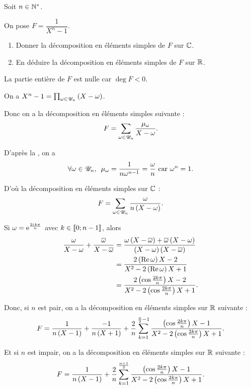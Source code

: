 \begin{exo}
Soit \(n\in\mathbb{N}^*\).

On pose \(F=\dfrac{1}{X^n-1}\).

\begin{enumerate}
\item Donner la décomposition en éléments simples de \(F\) sur \(\mathbb{C}\). \\

\item En déduire la décomposition en éléments simples de \(F\) sur \(\mathbb{R}\).
\end{enumerate}
\end{exo}

\begin{corr}[1]
La partie entière de \(F\) est nulle car \(\deg F<0\).

On a \(X^n-1=\prod_{\omega\in\mathscr{U}_n}\left(X-\omega\right)\).

Donc on a la décomposition en éléments simples suivante : \[F=\sum_{\omega\in\mathscr{U}_n}\dfrac{\mu_\omega}{X-\omega}.\]

D'après la , on a \[\quantifs{\forall\omega\in\U_n}\mu_\omega=\dfrac{1}{n\omega^{n-1}}=\dfrac{\omega}{n}\text{ car }\omega^n=1.\]

D'où la décomposition en éléments simples sur \(\mathbb{C}\) : \[F=\sum_{\omega\in\mathscr{U}_n}\dfrac{\omega}{n\left(X-\omega\right)}.\]
\end{corr}

\begin{corr}[2]
Si \(\omega=\mathrm{e}^{\frac{2i\mkern1mu k\pi}{n}}\) avec \(k\in\left\llbracket0;n-1\right\rrbracket\), alors \[\begin{aligned}
\dfrac{\omega}{X-\omega}+\dfrac{\overline{\omega}}{X-\overline{\omega}}&=\dfrac{\omega\left(X-\overline{\omega}\right)+\overline{\omega}\left(X-\omega\right)}{\left(X-\omega\right)\left(X-\overline{\omega}\right)} \\
&=\dfrac{2\left(\operatorname{Re}\omega\right)X-2}{X^2-2\left(\operatorname{Re}\omega\right)X+1} \\
&=\dfrac{2\left(\cos\frac{2k\pi}{n}\right)X-2}{X^2-2\left(\cos\frac{2k\pi}{n}\right)X+1}.
\end{aligned}\]

Donc, si \(n\) est pair, on a la décomposition en éléments simples sur \(\mathbb{R}\) suivante : \[F=\dfrac{1}{n\left(X-1\right)}+\dfrac{-1}{n\left(X+1\right)}+\dfrac{2}{n}\sum_{k=1}^{\frac{n}{2}-1}\dfrac{\left(\cos\frac{2k\pi}{n}\right)X-1}{X^2-2\left(\cos\frac{2k\pi}{n}\right)X+1}.\]

Et si \(n\) est impair, on a la décomposition en éléments simples sur \(\mathbb{R}\) suivante : \[F=\dfrac{1}{n\left(X-1\right)}+\dfrac{2}{n}\sum_{k=1}^{\frac{n+1}{2}}\dfrac{\left(\cos\frac{2k\pi}{n}\right)X-1}{X^2-2\left(\cos\frac{2k\pi}{n}\right)X+1}.\]
\end{corr}